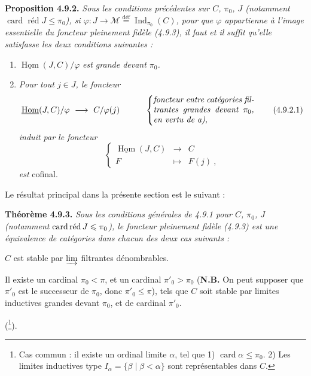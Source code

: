 \documentclass[11pt]{article}
\newcommand{\printedpage}[1]{\marginpar{\footnotesize p.~#1}}
\newcommand{\msp}[1]{\marginpar{\footnotesize [#1]}}
\newcommand{\card}{\operatorname{card}}
\newcommand{\Ind}{\operatorname{Ind}}
\newcommand{\cardred}{\mathop{\mathrm{card}\,\textup{réd}}\nolimits}
\newcommand{\red}{\operatorname{\text{réd}}}
\newcommand{\uHom}{\underline{\operatorname{Hom}}}
\newcommand{\cM}{\mathcal{M}}
\newcommand{\defeq}{\overset{\text{déf}}{=}}
\begin{document}
\textbf{Proposition 4.9.2.} \textit{Sous les conditions précédentes sur $C$, $\pi_0$, $J$ (notamment} $\card\red J \leqslant \pi_0$\textit{), si $\varphi : J \longrightarrow \cM \defeq \Ind_{\pi_0}(C)$, pour que $\varphi$ appartienne à l'image essentielle du foncteur pleinement fidèle (4.9.3), il faut et il suffit qu'elle satisfasse les deux conditions suivantes :}

\msp{page 219}

\begin{enumerate}[leftmargin=*]
\item[\textit{a)}] $\uHom(J, C)/\varphi$ \textit{est grande devant $\pi_0$.}
\item[\textit{b)}] \textit{Pour tout $j \in J$, le foncteur}
\[
\uHom(J, C)/\varphi \ \longrightarrow\ C/\varphi(j) \qquad\quad
\left\{
\parbox{0.35\textwidth}{\textit{foncteur entre catégories filtrantes grandes devant $\pi_0$, en vertu de a),}}
\right. \tag*{(4.9.2.1)}
\]
\textit{induit par le foncteur}
\[
\left\{
\begin{array}{rcl}
\uHom(J, C) & \longrightarrow & C \\
F & \longmapsto & F(j)\ ,
\end{array}
\right. \tag*{(4.9.2.2)}
\]
\textit{est} cofinal.
\end{enumerate}

\printedpage{79}

Le résultat principal dans la présente section est le suivant :

\textbf{Théorème 4.9.3.} \textit{Sous les conditions générales de 4.9.1 pour $C$, $\pi_0$, $J$ (notamment} $\cardred J \leqslant \pi_0$\textit{), le foncteur pleinement fidèle (4.9.3) est une équivalence de catégories dans chacun des deux cas suivants :}
\begin{itemize}[label={}]
{\itshape
\item[a)] $C$ est stable par $\varinjlim$ filtrantes dénombrables.
\item[b)] Il existe un cardinal $\pi_0 < \pi$, et un cardinal $\pi'_0 > \pi_0$ \textup{(}\textbf{\upshape N.B.} On peut supposer que $\pi'_0$ est le successeur de $\pi_0$, donc $\pi'_0 \leqslant \pi$), tels que $C$ soit stable par limites inductives grandes devant $\pi_0$, et de cardinal $\pi'_0$.
}
\end{itemize}
(\footnote[94]{Cas commun : il existe un ordinal limite $\alpha$, tel que 1) $\card \alpha \leqslant \pi_0$. 2) Les limites inductives type $I_\alpha = \{\beta \mid \beta < \alpha\}$ sont représentables dans $C$.}).
\end{document}
